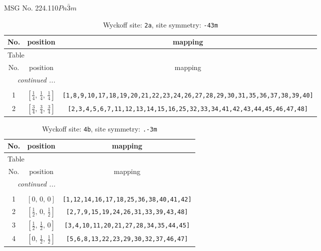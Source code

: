 \documentclass[fleqn,8pt]{jsarticle}
\begin{document}
\setcounter{MaxMatrixCols}{32}

\renewcommand{\tablename}{Table~}
\renewcommand{\figurename}{Figure~}
\begin{center}
\LARGE
MSG No. 224.110\quad$Pn\bar{3}m$
\end{center}
\renewcommand{\arraystretch}{1.2}
\begin{longtable}{ccc}
\caption{Wyckoff site: {\tt 2a}, site symmetry: {\tt -43m}}
 \\
 \hline \hline
No. & position & mapping \\ \hline \endfirsthead

\multicolumn{2}{l}{\tablename\ \thetable{}} \\
 \hline \hline
No. & position & mapping \\ \hline \endhead

 \hline \hline
\multicolumn{2}{r}{\footnotesize\it continued ...} \\ \endfoot

 \hline \hline
\multicolumn{2}{r}{} \\ \endlastfoot

1 & $\left[ \frac{1}{4},\, \frac{1}{4},\, \frac{1}{4} \right]$ & {\tt [1,8,9,10,17,18,19,20,21,22,23,24,26,27,28,29,30,31,35,36,37,38,39,40]} \\ \hline
2 & $\left[ \frac{3}{4},\, \frac{3}{4},\, \frac{3}{4} \right]$ & {\tt [2,3,4,5,6,7,11,12,13,14,15,16,25,32,33,34,41,42,43,44,45,46,47,48]} \\
\end{longtable}
\renewcommand{\arraystretch}{1.2}
\begin{longtable}{ccc}
\caption{Wyckoff site: {\tt 4b}, site symmetry: {\tt .-3m}}
 \\
 \hline \hline
No. & position & mapping \\ \hline \endfirsthead

\multicolumn{2}{l}{\tablename\ \thetable{}} \\
 \hline \hline
No. & position & mapping \\ \hline \endhead

 \hline \hline
\multicolumn{2}{r}{\footnotesize\it continued ...} \\ \endfoot

 \hline \hline
\multicolumn{2}{r}{} \\ \endlastfoot

1 & $\left[ 0,\, 0,\, 0 \right]$ & {\tt [1,12,14,16,17,18,25,36,38,40,41,42]} \\ \hline
2 & $\left[ \frac{1}{2},\, 0,\, \frac{1}{2} \right]$ & {\tt [2,7,9,15,19,24,26,31,33,39,43,48]} \\ \hline
3 & $\left[ \frac{1}{2},\, \frac{1}{2},\, 0 \right]$ & {\tt [3,4,10,11,20,21,27,28,34,35,44,45]} \\ \hline
4 & $\left[ 0,\, \frac{1}{2},\, \frac{1}{2} \right]$ & {\tt [5,6,8,13,22,23,29,30,32,37,46,47]} \\
\end{longtable}
\end{document}
